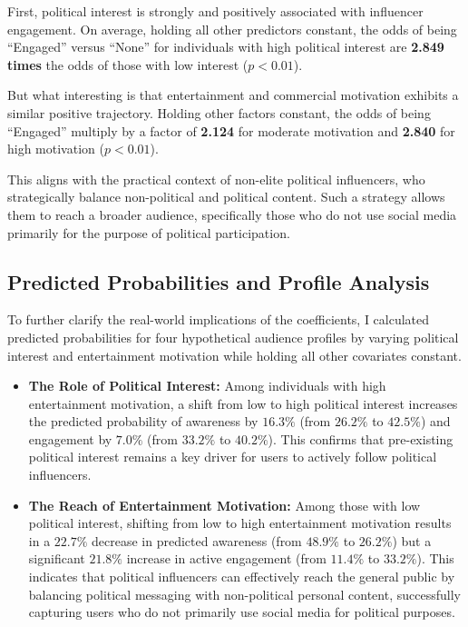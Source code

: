 \documentclass[12pt, a4paper]{article}
\begin{document}
	First, political interest is strongly and positively associated with influencer engagement. On average, holding all other predictors constant, the odds of being ``Engaged'' versus ``None'' for individuals with high political interest are \textbf{2.849 times} the odds of those with low interest ($p < 0.01$). 
	
	But what interesting is that entertainment and commercial motivation exhibits a similar positive trajectory. Holding other factors constant, the odds of being ``Engaged'' multiply by a factor of \textbf{2.124} for moderate motivation and \textbf{2.840} for high motivation ($p < 0.01$).
	
	This aligns with the practical context of non-elite political influencers, who strategically balance non-political and political content. Such a strategy allows them to reach a broader audience, specifically those who do not use social media primarily for the purpose of political participation.
	
	\subsection{Predicted Probabilities and Profile Analysis}
	
	To further clarify the real-world implications of the coefficients, I calculated predicted probabilities for four hypothetical audience profiles by varying political interest and entertainment motivation while holding all other covariates constant.
	
	\begin{itemize}
		\item \textbf{The Role of Political Interest:} Among individuals with high entertainment motivation, a shift from low to high political interest increases the predicted probability of awareness by $16.3\%$ (from $26.2\%$ to $42.5\%$) and engagement by $7.0\%$ (from $33.2\%$ to $40.2\%$). This confirms that pre-existing political interest remains a key driver for users to actively follow political influencers.
		
		\item \textbf{The Reach of Entertainment Motivation:} Among those with low political interest, shifting from low to high entertainment motivation results in a $22.7\%$ decrease in predicted awareness (from $48.9\%$ to $26.2\%$) but a significant $21.8\%$ increase in active engagement (from $11.4\%$ to $33.2\%$). This indicates that political influencers can effectively reach the general public by balancing political messaging with non-political personal content, successfully capturing users who do not primarily use social media for political purposes.
	\end{itemize}
	
\end{document}
